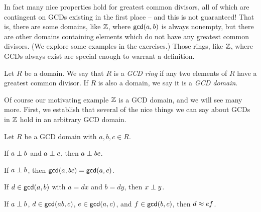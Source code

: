 In fact many nice properties hold for greatest common divisors, all of which are contingent on GCDs existing in the first place -- and this is not guaranteed!
That is, there are some domains, like \(\mathbb{Z}\), where \(\mathsf{gcd}(a, b)\) is always nonempty, but there are other domains containing elements which do not have any greatest common divisors.
(We explore some examples in the exercises.)
Those rings, like \(\mathbb{Z}\), where GCDs always exist are special enough to warrant a definition.

\begin{dfn} \label{dfn:gcd-ring}
Let \(R\) be a domain.
We say that \(R\) is a \emph{GCD ring} if any two elements of \(R\) have a greatest common divisor.
If \(R\) is also a domain, we say it is a \emph{GCD domain}.
\end{dfn}

Of course our motivating example \(\mathbb{Z}\) is a GCD domain, and we will see many more.
First, we establish that several of the nice things we can say about GCDs in \(\mathbb{Z}\) hold in an arbitrary GCD domain.

\begin{prop} \label{prop:gcd-dom-basics}
Let \(R\) be a GCD domain with \(a,b,c \in R\).
\begin{proplist*}
\item If \(a \perp b\) and \(a \perp c\), then \(a \perp bc\).
\item \label{prop:gcd-dom-basics:drop-factor} If \(a \perp b\), then \(\mathsf{gcd}(a, bc) = \mathsf{gcd}(a, c)\).
\item If \(d \in \mathsf{gcd}(a, b)\) with \(a = dx\) and \(b = dy\), then \(x \perp y\).
\item If \(a \perp b\), \(d \in \mathsf{gcd}(ab, c)\), \(e \in \mathsf{gcd}(a, c)\), and \(f \in \mathsf{gcd}(b, c)\), then \(d \approx ef\).
\end{proplist*}
\end{prop}

